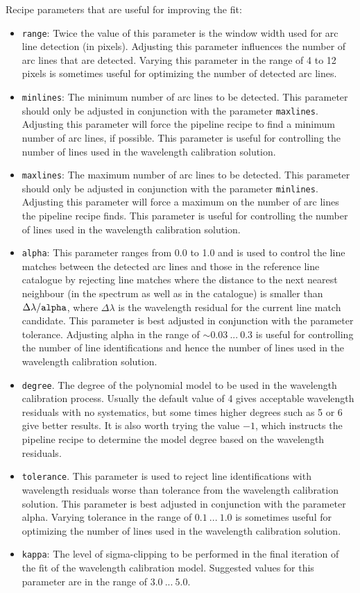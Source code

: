 Recipe parameters that are useful for improving the fit:
\begin{itemize}
    \item {\tt range}: Twice the value of this parameter is the window width used for 
    arc line detection (in pixels). Adjusting this parameter influences the number of arc lines 
    that are detected. Varying this parameter in the range of 4 to 12 pixels is sometimes useful 
    for optimizing the number of detected arc lines.
    \item {\tt minlines}: The minimum number of arc lines to be detected. 
    This parameter should only be adjusted in conjunction with the parameter {\tt maxlines}.
    Adjusting this parameter will force the
    pipeline recipe to find a minimum number of arc lines, if possible. This parameter is useful for
    controlling the number of lines used in the wavelength calibration solution.
    \item {\tt maxlines}: The maximum number of arc lines to be detected. This parameter should only be
    adjusted in conjunction with the parameter {\tt minlines}. Adjusting this parameter will force
    a maximum on the number of arc lines the pipeline recipe finds. 
    This parameter is useful for controlling
    the number of lines used in the wavelength calibration solution.
    \item {\tt alpha}: This parameter ranges from 0.0 to 1.0 
    and is used to control the line matches between
    the detected arc lines and those in the reference line catalogue by rejecting line matches where
    the distance to the next nearest neighbour (in the spectrum as well as in the catalogue) is smaller
    than $\Delta\lambda / {\tt alpha}$, where $\Delta\lambda$ is the wavelength residual for the current line match candidate. This
    parameter is best adjusted in conjunction with the parameter tolerance. Adjusting alpha in the
    range of $\sim 0.03\ ...\ 0.3$ is useful for controlling the number of line identifications 
    and hence the number of lines used in the wavelength calibration solution.
    \item {\tt degree}. The degree of the polynomial model to be used in the wavelength 
    calibration process. Usually the default value of 4 gives acceptable wavelength residuals 
    with no systematics, but some
    times higher degrees such as 5 or 6 give better results. It is also worth trying the value $-1$, 
    which
    instructs the pipeline recipe to determine the model degree based on the wavelength residuals.
    \item {\tt tolerance}. This parameter is used to reject line identifications with 
    wavelength residuals worse
    than tolerance from the wavelength calibration solution. This parameter is best adjusted in
    conjunction with the parameter alpha. Varying tolerance in the range of $0.1\ ...\ 1.0$ is sometimes
    useful for optimizing the number of lines used in the wavelength calibration solution.
    \item {\tt kappa}: The level of sigma-clipping to be performed in the final iteration 
    of the fit of the wavelength calibration model. 
    Suggested values for this parameter are in the range of $3.0\ ...\ 5.0$.
\end{itemize}

